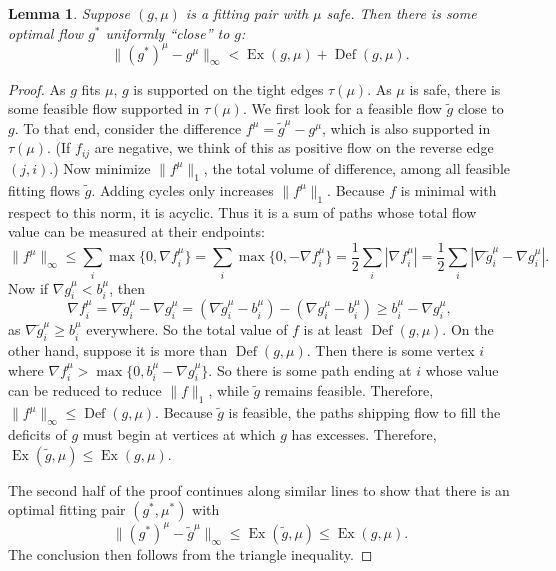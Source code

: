 \documentclass[11pt]{article}
\newtheorem{lemma}[theorem]{Lemma}
\theoremstyle{definition}
\theoremstyle{definition}
\newcommand{\fu}{f^{\mu}}
\newcommand{\nfiu}{\nabla \fu_i}
\newcommand{\biu}{b_{i}^{\mu}}
\DeclareMathOperator{\Ex}{Ex}
\DeclareMathOperator{\Def}{Def}
\begin{document}
    \begin{lemma} \label{lem.bound-dist}
    Suppose $(g, \mu)$ is a fitting pair with $\mu$ safe. Then there is some optimal flow $g^*$
    uniformly ``close'' to $g$:
    \[ \|(g^*)^\mu - g^\mu\|_\infty < \Ex(g, \mu) + \Def(g, \mu). \]
    \end{lemma}
    \begin{proof}
			As $g$ fits $\mu$, $g$ is supported on the tight edges $\tau(\mu)$. As
			$\mu$ is safe, there is some feasible flow supported in $\tau(\mu)$. We first
    look for a feasible flow $\tilde{g}$ close to $g$. To that end, consider the
    difference $f^\mu = \tilde{g}^\mu - g^\mu$, which is also supported in $\tau(\mu)$.
    (If $f_{ij}$ are negative, we think of this as positive flow on the reverse edge $(j, i)$.)
    Now minimize $\|f^\mu\|_1$, the total volume of difference,
    among all feasible fitting flows $\tilde{g}$. Adding cycles only increases $\|f^\mu\|_1$.
    Because $f$ is minimal with respect to this norm, it is acyclic. Thus it is a sum of
    paths whose total flow value can be measured at their endpoints:
    \[ \|f^\mu\|_\infty \leq \sum_i \max\{0, \nfiu\} = \sum_i \max\{0, -\nfiu\} = \frac{1}{2}\sum_i |\nfiu|
     = \frac{1}{2}\sum_i |\nabla \tilde{g}^\mu_i - \nabla g^\mu_i|. \]
    Now if $\nabla g_i^\mu < b_i^\mu$, then
    \[ \nfiu = \nabla \tilde{g}_i^\mu - \nabla g_i^\mu
     = (\nabla \tilde{g}_i^\mu - b_i^\mu) - (\nabla g_i^\mu - b_i^\mu) \geq b_i^\mu - \nabla g_i^\mu, \]
    as $\nabla \tilde{g}_i^\mu \geq b_i^\mu$ everywhere. So the total value of $f$ is at least
    $\Def(g, \mu)$. On the other hand, suppose it is more than $\Def(g, \mu)$. Then there
    is some vertex $i$ where $\nfiu > \max\{0, \biu - \nabla g_i^\mu\}$. So there is some path
    ending at $i$ whose value can be reduced to reduce $\|f\|_1$, while $\tilde{g}$
    remains feasible. Therefore, $\|f^\mu\|_\infty \leq \Def(g, \mu)$. Because $\tilde{g}$ is feasible,
    the paths shipping flow to fill the deficits of $g$ must begin at vertices at which $g$ has
    excesses. Therefore, $\Ex(\tilde{g}, \mu) \leq \Ex(g, \mu)$.
    
    The second half of the proof continues along similar lines to show that there is an optimal
    fitting pair $(g^*, \mu^*)$ with
    \[ \|(g^*)^\mu - \tilde{g}^\mu\|_\infty \leq \Ex(\tilde{g}, \mu) \leq \Ex(g, \mu). \]
    The conclusion then follows from the triangle inequality.
    
    \end{proof}
    
\end{document}
